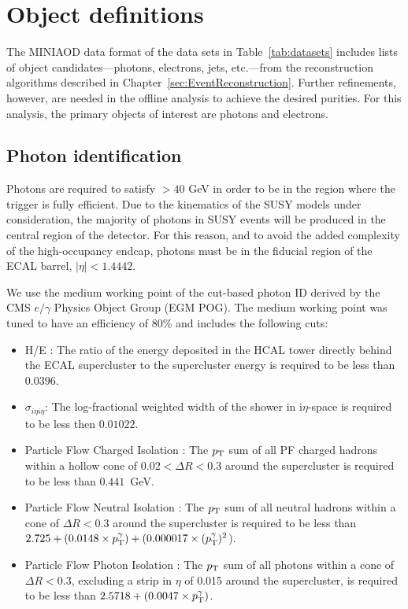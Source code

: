 \section{Object definitions}
\label{sec:ObjSelect}

The MINIAOD data format of the data sets in Table~\ref{tab:datasets} includes lists of object candidates---photons, electrons, jets, etc.---from the reconstruction algorithms described in Chapter~\ref{sec:EventReconstruction}. Further refinements, however, are needed in the offline analysis to achieve the desired purities. For this analysis, the primary objects of interest are photons and electrons.

\subsection{Photon identification}
\label{sec:phoID}
Photons are required to satisfy \pT $> 40$ GeV in order to be in the region where the trigger is fully efficient. Due to the kinematics of the SUSY models under consideration, the majority of photons in SUSY events will be produced in the central region of the detector. For this reason, and to avoid the added complexity of the high-occupancy endcap, photons must be in the fiducial region of the ECAL barrel, $|\eta| < 1.4442$. 

We use the medium working point of the cut-based photon ID derived by the CMS $e/\gamma$ Physics Object Group (EGM POG). The medium working point was tuned to have an efficiency of 80\% and includes the following cuts:

\begin{itemize}
\item { H/E :} The ratio of the energy deposited in the HCAL tower directly behind the ECAL supercluster to the supercluster energy is required to be less than $0.0396$.
\item {$\sigma_{i{\eta}i{\eta}}$:} The log-fractional weighted width of the shower in i{$\eta$}-space is required to be less then $0.01022$.
\item {Particle Flow Charged Isolation :} The $p_{\mathrm{T}}$ sum of all PF charged hadrons within a hollow cone of $0.02 < \Delta R < 0.3$ around the supercluster is required to be less than $0.441$~GeV.
\item {Particle Flow Neutral Isolation :} The $p_{\mathrm{T}}$ sum of all neutral hadrons within a cone of $\Delta R <0.3$ around the supercluster
                                              is required to be less than $2.725 + (0.0148 \times p_{\mathrm{T}}^{\gamma}) + (0.000017 \times (p_{\mathrm{T}}^{\gamma})^2$).
\item {Particle Flow Photon Isolation :} The $p_{\mathrm{T}}$ sum of all photons within a cone of $\Delta R < 0.3$,
                                             excluding a strip in $\eta$ of 0.015 around the supercluster, is required to be less than $2.5718 + (0.0047 \times p_{\mathrm{T}}^{\gamma})$.
\end{itemize}

